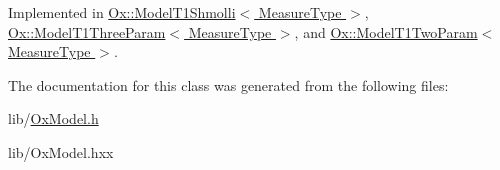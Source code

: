 Implemented in \hyperlink{class_ox_1_1_model_t1_shmolli_a846fb817183738d5c2b3f9f126c1597b}{Ox\+::\+Model\+T1\+Shmolli$<$ Measure\+Type $>$}, \hyperlink{class_ox_1_1_model_t1_three_param_afc6ffe41934c513e12a45cc5821fddca}{Ox\+::\+Model\+T1\+Three\+Param$<$ Measure\+Type $>$}, and \hyperlink{class_ox_1_1_model_t1_two_param_aa090c6834141f00a966eebd6b0415e44}{Ox\+::\+Model\+T1\+Two\+Param$<$ Measure\+Type $>$}.



The documentation for this class was generated from the following files\+:\begin{DoxyCompactItemize}
\item 
lib/\hyperlink{_ox_model_8h}{Ox\+Model.\+h}\item 
lib/Ox\+Model.\+hxx\end{DoxyCompactItemize}
